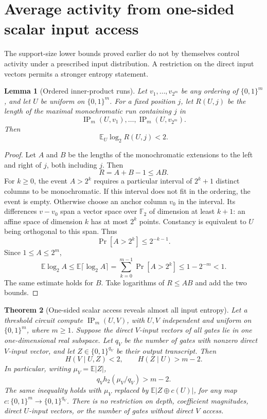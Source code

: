 \documentclass[11pt]{article}
\newtheorem{theorem}{Theorem}[section]
\newtheorem{lemma}[theorem]{Lemma}
\theoremstyle{definition}
\newcommand{\bits}{\{0,1\}}
\newcommand{\ip}{\operatorname{IP}}
\begin{document}
\section{Average activity from one-sided scalar input access}\label{sec:one_sided_entropy}

The support-size lower bounds proved earlier do not by themselves control activity under a prescribed input distribution. A restriction on the direct input vectors permits a stronger entropy statement.

\begin{lemma}[Ordered inner-product runs]\label{lem:ip_ordered_runs}
Let \(v_1,\ldots,v_{2^m}\) be any ordering of \(\bits^m\), and let \(U\) be uniform on \(\bits^m\). For a fixed position \(j\), let \(R(U,j)\) be the length of the maximal monochromatic run containing \(j\) in
\[
 \ip_m(U,v_1),\ldots,\ip_m(U,v_{2^m}).
\]
Then
\[
 \mathbb E_U\log_2 R(U,j)<2.
\]
\end{lemma}

\begin{proof}
Let \(A\) and \(B\) be the lengths of the monochromatic extensions to the left and right of \(j\), both including \(j\). Then
\[
 R=A+B-1\le AB.
\]
For \(k\ge0\), the event \(A>2^k\) requires a particular interval of \(2^k+1\) distinct columns to be monochromatic. If this interval does not fit in the ordering, the event is empty. Otherwise choose an anchor column \(v_0\) in the interval. Its differences \(v-v_0\) span a vector space over \(\mathbb F_2\) of dimension at least \(k+1\): an affine space of dimension \(k\) has at most \(2^k\) points. Constancy is equivalent to \(U\) being orthogonal to this span. Thus
\[
 \Pr[A>2^k]\le2^{-k-1}.
\]
Since \(1\le A\le2^m\),
\[
 \mathbb E\log_2 A
 \le\mathbb E\lceil\log_2 A\rceil
 =\sum_{k=0}^{m-1}\Pr[A>2^k]
 \le1-2^{-m}<1.
\]
The same estimate holds for \(B\). Take logarithms of \(R\le AB\) and add the two bounds.
\end{proof}

\begin{theorem}[One-sided scalar access reveals almost all input entropy]\label{thm:ip_one_sided_entropy}
Let a threshold circuit compute \(\ip_m(U,V)\), with \(U,V\) independent and uniform on \(\bits^m\), where \(m\ge1\). Suppose the direct \(V\)-input vectors of all gates lie in one one-dimensional real subspace. Let \(q_V\) be the number of gates with nonzero direct \(V\)-input vector, and let \(Z\in\bits^{q_V}\) be their output transcript. Then
\[
 H(V\mid U,Z)<2,
 \qquad H(Z\mid U)>m-2.
\]
In particular, writing \(\mu_V=\mathbb E|Z|\),
\[
 q_V h_2(\mu_V/q_V)>m-2.
\]
The same inequality holds with \(\mu_V\) replaced by
\(\mathbb E|Z\mathbin\oplus c(U)|\), for any map
\(c:\bits^m\to\bits^{q_V}\).
There is no restriction on depth, coefficient magnitudes, direct \(U\)-input vectors, or the number of gates without direct \(V\) access.
\end{theorem}
\end{document}
